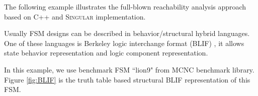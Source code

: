 The following example illustrates the full-blown reachability analysis approach
based on C++ and \textsc{Singular} implementation.

\begin{Example}
Usually FSM designs can be described in behavior/structural hybrid languages.
One of these languages is Berkeley logic interchange format (BLIF) \cite{BLIF},
it allows state behavior representation and logic component representation.

In this example, we use benchmark FSM ``lion9" from MCNC benchmark library.
Figure \ref{fig:BLIF} is the truth table based structural BLIF representation of this FSM.

\begin{figure}[hbt]
\end{figure}


\end{Example}
